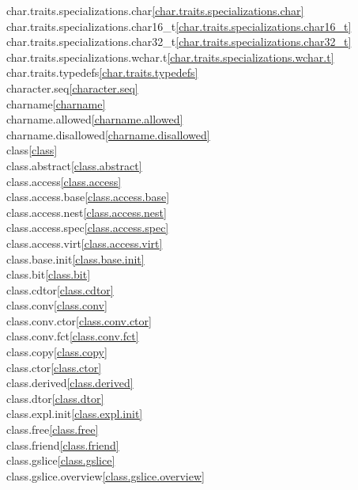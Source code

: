 \begin{multicols}{2}
char.traits.specializations.char\quad\ref{char.traits.specializations.char}\\
char.traits.specializations.char16_t\quad\ref{char.traits.specializations.char16_t}\\
char.traits.specializations.char32_t\quad\ref{char.traits.specializations.char32_t}\\
char.traits.specializations.wchar.t\quad\ref{char.traits.specializations.wchar.t}\\
char.traits.typedefs\quad\ref{char.traits.typedefs}\\
character.seq\quad\ref{character.seq}\\
charname\quad\ref{charname}\\
charname.allowed\quad\ref{charname.allowed}\\
charname.disallowed\quad\ref{charname.disallowed}\\
class\quad\ref{class}\\
class.abstract\quad\ref{class.abstract}\\
class.access\quad\ref{class.access}\\
class.access.base\quad\ref{class.access.base}\\
class.access.nest\quad\ref{class.access.nest}\\
class.access.spec\quad\ref{class.access.spec}\\
class.access.virt\quad\ref{class.access.virt}\\
class.base.init\quad\ref{class.base.init}\\
class.bit\quad\ref{class.bit}\\
class.cdtor\quad\ref{class.cdtor}\\
class.conv\quad\ref{class.conv}\\
class.conv.ctor\quad\ref{class.conv.ctor}\\
class.conv.fct\quad\ref{class.conv.fct}\\
class.copy\quad\ref{class.copy}\\
class.ctor\quad\ref{class.ctor}\\
class.derived\quad\ref{class.derived}\\
class.dtor\quad\ref{class.dtor}\\
class.expl.init\quad\ref{class.expl.init}\\
class.free\quad\ref{class.free}\\
class.friend\quad\ref{class.friend}\\
class.gslice\quad\ref{class.gslice}\\
class.gslice.overview\quad\ref{class.gslice.overview}\\

\end{multicols}
